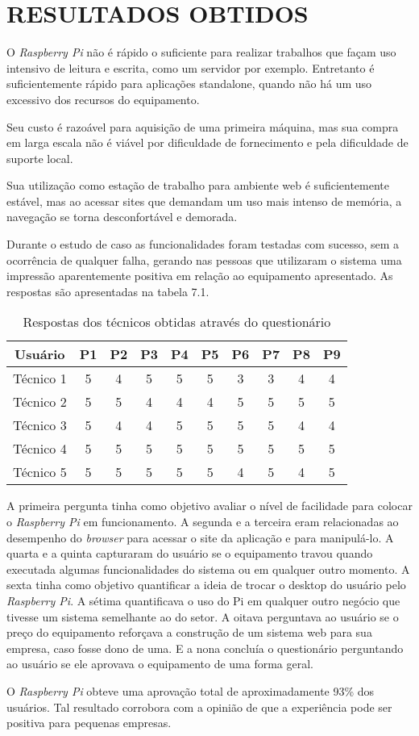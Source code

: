 \chapter{RESULTADOS OBTIDOS}

O \textit{Raspberry Pi} não é rápido o suficiente para realizar trabalhos que façam uso intensivo de leitura e escrita, como um servidor por exemplo. Entretanto é suficientemente rápido para aplicações standalone, quando não há um uso excessivo dos recursos do equipamento.

Seu custo é razoável para aquisição de uma primeira máquina, mas sua compra em larga escala não é viável por dificuldade de fornecimento e pela dificuldade de suporte local.

Sua utilização como estação de trabalho para ambiente web é suficientemente estável, mas ao acessar sites que demandam um uso mais intenso de memória, a navegação se torna desconfortável e demorada.

Durante o estudo de caso as funcionalidades foram testadas com sucesso, sem a ocorrência de qualquer falha, gerando nas pessoas que utilizaram o sistema uma impressão aparentemente positiva em relação ao equipamento apresentado. As respostas são apresentadas na tabela 7.1.

\begin{table}[!htpb]
 \centering
    \begin{tabular}{|c|c|c|c|c|c|c|c|c|c|} 
    \hline
        \textbf{Usuário} & \textbf{P1} & \textbf{P2} & \textbf{P3} & \textbf{P4} & \textbf{P5} & \textbf{P6} & \textbf{P7} & \textbf{P8} & \textbf{P9} \\
    \hline
        Técnico 1 & 5 & 4 & 5 & 5 & 5 & 3 & 3 & 4 & 4 \\
    \hline
        Técnico 2 & 5 & 5 & 4 & 4 & 4 & 5 & 5 & 5 & 5 \\
    \hline
        Técnico 3  & 5 & 4 &	4 &	5 &	5 &	5 &	5 &	4 &	4 \\
    \hline
    	Técnico 4  & 5 & 5 &	5 &	5 &	5 &	5 &	5 &	5 &	5 \\
    \hline
 	    Técnico 5  & 5 & 5 & 5 & 5 & 5 & 4 & 5 & 4 & 5 \\
    \hline
    \end{tabular}
    \caption{Respostas dos técnicos obtidas através do questionário}
    \label{t_fixa}
\end{table}

A primeira pergunta tinha como objetivo avaliar o nível de facilidade para colocar o \textit{Raspberry Pi} em funcionamento. A segunda e a terceira eram relacionadas ao desempenho do \textit{browser} para acessar o site da aplicação e para manipulá-lo. A quarta e a quinta capturaram do usuário se o equipamento travou quando executada algumas funcionalidades do sistema ou em qualquer outro momento. A sexta tinha como objetivo quantificar a ideia de trocar o desktop do usuário pelo \textit{Raspberry Pi}. A sétima quantificava o uso do Pi em qualquer outro negócio que tivesse um sistema semelhante ao do setor. A oitava perguntava ao usuário se o preço do equipamento reforçava a construção de um sistema web para sua empresa, caso fosse dono de uma. E a nona concluía o questionário perguntando ao usuário se ele aprovava o equipamento de uma forma geral.

O \textit{Raspberry Pi} obteve uma aprovação total de aproximadamente 93\% dos usuários. Tal resultado corrobora com a opinião de que a experiência pode ser positiva para pequenas empresas.